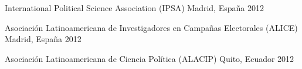 \begin{cvhonors}
\cvconf
{International Political Science Association (IPSA)} 
{Madrid, España}
{2012}
\end{cvhonors}

\begin{cvhonors}
\cvconf
{Asociación Latinoamericana de Investigadores en Campañas Electorales (ALICE)} 
{Madrid, España}
{2012}
\end{cvhonors}

\begin{cvhonors}
\cvconf
{Asociación Latinoamericana de Ciencia Política (ALACIP)} 
{Quito, Ecuador}
{2012}
\end{cvhonors}

\vspace{1mm}